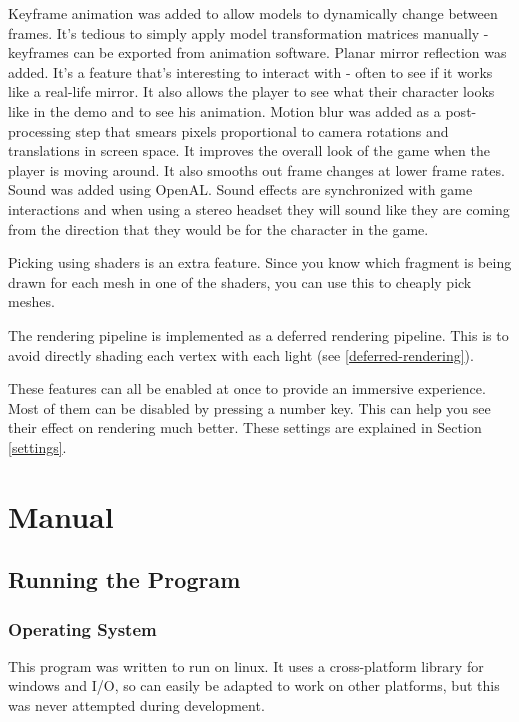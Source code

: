 \documentclass[oneside]{book}
\begin{document}
    Keyframe animation was added to allow models to dynamically change between frames. It's tedious to simply apply model transformation matrices manually - keyframes can be exported from animation software.
    Planar mirror reflection was added. It's a feature that's interesting to interact with - often to see if it works like a real-life mirror. It also allows the player to see what their character looks like in the demo and to see his animation.
    Motion blur was added as a post-processing step that smears pixels proportional to camera rotations and translations in screen space. It improves the overall look of the game when the player is moving around. It also smooths out frame changes at lower frame rates.
    Sound was added using OpenAL. Sound effects are synchronized with game interactions and when using a stereo headset they will sound like they are coming from the direction that they would be for the character in the game.

    Picking using shaders is an extra feature. Since you know which fragment is being drawn for each mesh in one of the shaders, you can use this to cheaply pick meshes.

    The rendering pipeline is implemented as a deferred rendering pipeline. This is to avoid directly shading each vertex with each light (see \ref{deferred-rendering}).

    These features can all be enabled at once to provide an immersive experience. Most of them can be disabled by pressing a number key. This can help you see their effect on rendering much better. These settings are explained in Section \ref{settings}.


\chapter{Manual}
  \section{Running the Program}
    \subsection{Operating System}
      This program was written to run on linux. It uses a cross-platform library for windows and I/O, so can easily be adapted to work on other platforms, but this was never attempted during development.
\end{document}
